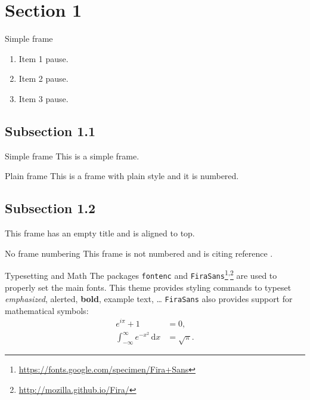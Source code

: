 
    \section{Section 1}
    \begin{frame}{Simple frame}
        \begin{enumerate}
            \item Item 1 pause.
            \pause
            \item Item 2 pause.
            \pause
            \item Item 3 pause.
        \end{enumerate}
    \end{frame}
    \subsection{Subsection 1.1}
    \begin{frame}{Simple frame}
        This is a simple frame.
    \end{frame}
    
    \begin{frame}[plain]{Plain frame}
        This is a frame with plain style and it is numbered.
    \end{frame}
    \subsection{Subsection 1.2}
    \begin{frame}[t]
        This frame has an empty title and is aligned to top.
    \end{frame}
    
    \begin{frame}[noframenumbering]{No frame numbering}
        This frame is not numbered and is citing reference \cite{knuth74}.
    \end{frame}
    
    \begin{frame}{Typesetting and Math}
        The packages \texttt{fontenc} and \texttt{FiraSans}\footnote{\url{https://fonts.google.com/specimen/Fira+Sans}}\textsuperscript{,}\footnote{\url{http://mozilla.github.io/Fira/}} are used to properly set the main fonts.
        \vfill
        This theme provides styling commands to typeset \emph{emphasized}, \alert{alerted}, \textbf{bold}, \textcolor{example}{example text}, \dots
        \vfill
        \texttt{FiraSans} also provides support for mathematical symbols:
        \begin{align*}
            e^{i\pi} + 1 & = 0, \\
            \int_{-\infty}^\infty e^{-x^2}\,\mathrm{d}x & = \sqrt{\pi}.
        \end{align*}
    \end{frame}
